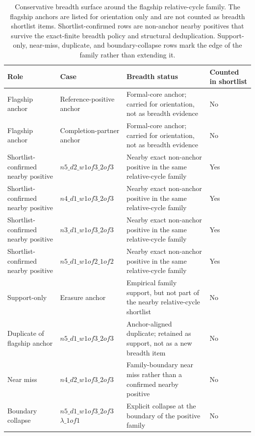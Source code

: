 \documentclass[11pt]{article}
\theoremstyle{definition}
\begin{document}
\begin{table}[t]
\centering
\small
\caption{Conservative breadth surface around the flagship relative-cycle family. The flagship anchors are listed for orientation only and are not counted as breadth shortlist items. Shortlist-confirmed rows are non-anchor nearby positives that survive the exact-finite breadth policy and structural deduplication. Support-only, near-miss, duplicate, and boundary-collapse rows mark the edge of the family rather than extending it.}
\label{tab:route-a-breadth-shortlist}
\begin{tabular}{p{2.8cm}p{3.6cm}p{5.2cm}p{1.8cm}}
\toprule
Role & Case & Breadth status & Counted in shortlist \\
\midrule
Flagship anchor &
Reference-positive anchor &
Formal-core anchor; carried for orientation, not as breadth evidence &
No \\
\addlinespace
Flagship anchor &
Completion-partner anchor &
Formal-core anchor; carried for orientation, not as breadth evidence &
No \\
\addlinespace
Shortlist-confirmed nearby positive &
$n5\_d2\_w1of3\_2of3$ &
Nearby exact non-anchor positive in the same relative-cycle family &
Yes \\
\addlinespace
Shortlist-confirmed nearby positive &
$n4\_d1\_w1of3\_2of3$ &
Nearby exact non-anchor positive in the same relative-cycle family &
Yes \\
\addlinespace
Shortlist-confirmed nearby positive &
$n3\_d1\_w1of3\_2of3$ &
Nearby exact non-anchor positive in the same relative-cycle family &
Yes \\
\addlinespace
Shortlist-confirmed nearby positive &
$n5\_d1\_w1of2\_1of2$ &
Nearby exact non-anchor positive in the same relative-cycle family &
Yes \\
\addlinespace
Support-only &
Erasure anchor &
Empirical family support, but not part of the nearby relative-cycle shortlist &
No \\
\addlinespace
Duplicate of flagship anchor &
$n5\_d1\_w1of3\_2of3$ &
Anchor-aligned duplicate; retained as support, not as a new breadth item &
No \\
\addlinespace
Near miss &
$n4\_d2\_w1of3\_2of3$ &
Family-boundary near miss rather than a confirmed nearby positive &
No \\
\addlinespace
Boundary collapse &
$n5\_d1\_w1of3\_2of3$\newline$\lambda\_1of1$ &
Explicit collapse at the boundary of the positive family &
No \\
\bottomrule
\end{tabular}
\end{table}
 
\end{document}

